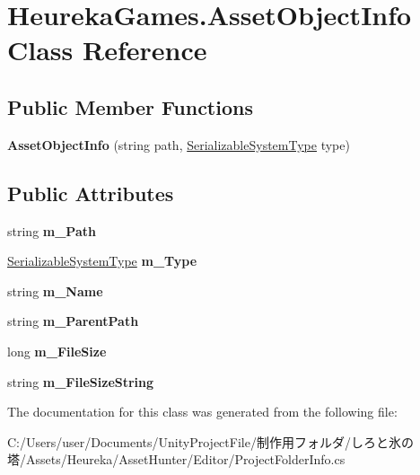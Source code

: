 \hypertarget{class_heureka_games_1_1_asset_object_info}{}\section{Heureka\+Games.\+Asset\+Object\+Info Class Reference}
\label{class_heureka_games_1_1_asset_object_info}
\subsection*{Public Member Functions}
\begin{DoxyCompactItemize}
\item 
\mbox{\label{class_heureka_games_1_1_asset_object_info_a1c15b89f1a0ff58c8a28118cb908a040}} 
{\bfseries Asset\+Object\+Info} (string path, \hyperlink{class_heureka_games_1_1_serializable_system_type}{Serializable\+System\+Type} type)
\end{DoxyCompactItemize}
\subsection*{Public Attributes}
\begin{DoxyCompactItemize}
\item 
\mbox{\label{class_heureka_games_1_1_asset_object_info_a75aa40798567ca9393ed2c3c3817d984}} 
string {\bfseries m\+\_\+\+Path}
\item 
\mbox{\label{class_heureka_games_1_1_asset_object_info_a88fe449b0e7fd306cedeb227ebb9f218}} 
\hyperlink{class_heureka_games_1_1_serializable_system_type}{Serializable\+System\+Type} {\bfseries m\+\_\+\+Type}
\item 
\mbox{\label{class_heureka_games_1_1_asset_object_info_aa8054c103e176e5ea6ed2b05bcbd064f}} 
string {\bfseries m\+\_\+\+Name}
\item 
\mbox{\label{class_heureka_games_1_1_asset_object_info_a647efe0fcb90016da804b38d16f25129}} 
string {\bfseries m\+\_\+\+Parent\+Path}
\item 
\mbox{\label{class_heureka_games_1_1_asset_object_info_a96a4e003ec3bb83f05ab69ce7b92a8fb}} 
long {\bfseries m\+\_\+\+File\+Size}
\item 
\mbox{\label{class_heureka_games_1_1_asset_object_info_a51164216fd8dd998a91ef5f52c181015}} 
string {\bfseries m\+\_\+\+File\+Size\+String}
\end{DoxyCompactItemize}


The documentation for this class was generated from the following file\+:\begin{DoxyCompactItemize}
\item 
C\+:/\+Users/user/\+Documents/\+Unity\+Project\+File/制作用フォルダ/しろと氷の塔/\+Assets/\+Heureka/\+Asset\+Hunter/\+Editor/Project\+Folder\+Info.\+cs\end{DoxyCompactItemize}

